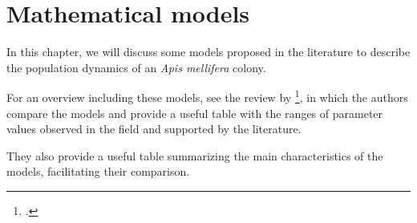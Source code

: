 %
%
%


\chapter{Mathematical models}
\begin{flushright}
    \small
\end{flushright}

In this chapter, we will discuss some models proposed in the literature to describe the population dynamics of an \emph{Apis mellifera} colony.

For an overview including these models, see the review by \citeauthor{chen_review}\footcite{chen_review},
in which the authors compare the models and provide a useful table with the ranges of
parameter values observed in the field and supported by the literature.

They also provide a useful table summarizing the main characteristics of the models,
facilitating their comparison.

